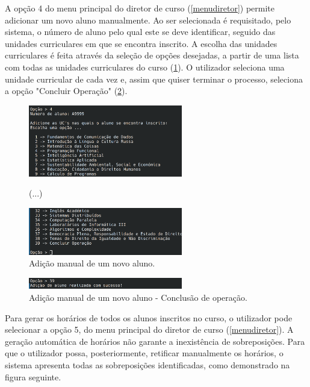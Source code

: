 \documentclass[12pt, a4paper]{article}
\begin{document}
A opção 4 do menu principal do diretor de curso (\ref{menudiretor}) permite adicionar um novo aluno
manualmente. Ao ser selecionada é requisitado, pelo sistema, o número de aluno pelo qual este se
deve identificar, seguido das unidades curriculares em que se encontra inscrito. A escolha das
unidades curriculares é feita através da seleção de opções desejadas, a partir de uma lista com
todas as unidades curriculares do curso (\ref{listaucs}). O utilizador seleciona uma unidade
curricular de cada vez e, assim que quiser terminar o processo, seleciona a opção
"Concluir Operação" (\ref{adicaoconcluida}).

\begin{figure}[H]
    \centering
    \includegraphics[width=0.6\textwidth]{Imagens/Manual/DiretorCurso-4-1.png}

    (...)

    \includegraphics[width=0.6\textwidth]{Imagens/Manual/DiretorCurso-4-2.png}
    \caption{Adição manual de um novo aluno.}
    \label{listaucs}
\end{figure}

\begin{figure}[H]
    \centering
    \includegraphics[width=0.6\textwidth]{Imagens/Manual/DiretorCurso-4-3.png}
    \caption{Adição manual de um novo aluno - Conclusão de operação.}
    \label{adicaoconcluida}
\end{figure}

Para gerar os horários de todos os alunos inscritos no curso, o utilizador pode selecionar a opção
5, do menu principal do diretor de curso (\ref{menudiretor}). A geração automática de horários não
garante a inexistência de sobreposições. Para que o utilizador possa, posteriormente, retificar
manualmente os horários, o sistema apresenta todas as sobreposições identificadas, como demonstrado
na figura seguinte.
\end{document}
